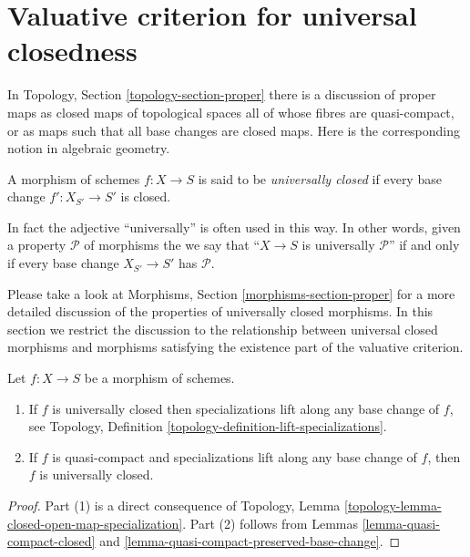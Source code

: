 \section{Valuative criterion for universal closedness}
\label{section-valuative-criterion-universal-closedness}

\noindent
In Topology, Section \ref{topology-section-proper} there is a
discussion of proper maps as closed maps of topological spaces
all of whose fibres are quasi-compact, or as maps such that
all base changes are closed maps. Here is the corresponding notion
in algebraic geometry.

\begin{definition}
\label{definition-universally-closed}
A morphism of schemes $f : X \to S$ is said to be
{\it universally closed} if every base change
$f' : X_{S'} \to S'$ is closed.
\end{definition}

\noindent
In fact the adjective ``universally'' is often used in this way.
In other words, given a property $\mathcal{P}$ of morphisms
the we say that ``$X \to S$ is universally $\mathcal{P}$''
if and only if every base change $X_{S'} \to S'$ has $\mathcal{P}$.

\medskip\noindent
Please take a look at Morphisms, Section \ref{morphisms-section-proper} for a
more detailed discussion of the properties of universally closed morphisms.
In this section we restrict the discussion to the relationship between
universal closed morphisms and morphisms satisfying the
existence part of the valuative criterion.

\begin{lemma}
\label{lemma-specializations-lift}
Let $f : X \to S$ be a morphism of schemes.
\begin{enumerate}
\item If $f$ is universally closed then specializations lift
along any base change of $f$, see
Topology, Definition \ref{topology-definition-lift-specializations}.
\item If $f$ is quasi-compact and specializations lift
along any base change of $f$, then $f$ is universally closed.
\end{enumerate}
\end{lemma}

\begin{proof}
Part (1) is a direct consequence of
Topology, Lemma \ref{topology-lemma-closed-open-map-specialization}.
Part (2) follows from
Lemmas \ref{lemma-quasi-compact-closed} and
\ref{lemma-quasi-compact-preserved-base-change}.
\end{proof}

